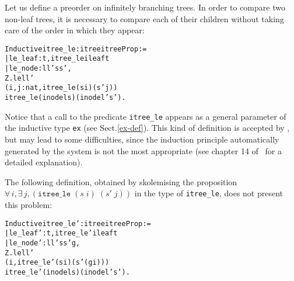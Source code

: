 \documentclass[11pt]{article}
\begin{document}
Let us define a preorder on infinitely branching trees.
 In order to compare two non-leaf trees,
it is necessary to compare each of their children
 without taking care of the order in which they
appear:

\begin{alltt}
Inductive itree_le : itree{\arrow} itree {\arrow} Prop :=
  | le_leaf : {\prodsym} t, itree_le  ileaf t
  | le_node : {\prodsym} l l' s s',
                Z.le l l' {\arrow}
                ({\prodsym} i, {\exsym} j:nat, itree_le (s i) (s' j)){\arrow}
                itree_le  (inode  l s) (inode  l' s').

\end{alltt}

Notice that a call to the predicate \texttt{itree\_le} appears as
a general parameter of the inductive type  \texttt{ex} (see Sect.\ref{ex-def}).
This kind of definition is accepted by {\coq}, but may lead to some
difficulties, since the induction principle automatically
generated by the system
is not the most appropriate (see chapter 14 of~\cite{coqart} for a detailed
explanation).


The following definition, obtained by
skolemising the
proposition \linebreak $\forall\, i,\exists\, j,(\texttt{itree\_le}\;(s\;i)\;(s'\;j))$ in
the type of \texttt{itree\_le}, does not present this problem:


\begin{alltt}
Inductive itree_le' : itree{\arrow} itree {\arrow} Prop :=
  | le_leaf'  : {\prodsym} t, itree_le'  ileaf t
  | le_node' : {\prodsym} l l' s s' g,
                  Z.le l l' {\arrow}
                  ({\prodsym} i, itree_le' (s i) (s' (g i))) {\arrow}
                  itree_le'  (inode  l s) (inode  l' s').

\end{alltt}
\iffalse
\begin{alltt}
Lemma t1_le'_t2 :  itree_le' t1 t2.
Proof.
 unfold t1, t2.
 constructor 2  with (fun i : nat {\funarrow} 2 * i).
 auto with zarith.
 unfold isingle;
 intro i ; constructor 2 with (fun i :nat {\funarrow} i).
 auto with zarith.
 constructor .
Qed.
\end{alltt}
\fi

\end{document}

